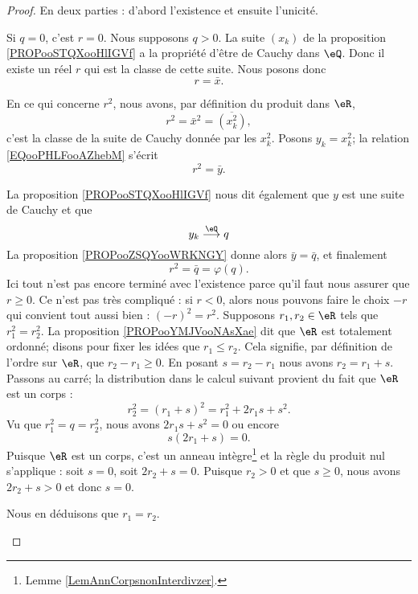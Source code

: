 \begin{proof}
	En deux parties : d'abord l'existence et ensuite l'unicité.
	\begin{subproof}
		\spitem[Existence]
		Si \( q=0\), c'est \( r=0\). Nous supposons \( q>0\). La suite \( (x_k)\) de la proposition \ref{PROPooSTQXooHlIGVf} a la propriété d'être de Cauchy dans \( \eQ\). Donc il existe un réel \( r\) qui est la classe de cette suite. Nous posons donc
		\begin{equation}
			r=\bar x.
		\end{equation}

		En ce qui concerne \( r^2\), nous avons, par définition du produit dans \( \eR\),
		\begin{equation}        \label{EQooPHLFooAZhebM}
			r^2=\bar x^2=\overline{ (x_k^2) },
		\end{equation}
		c'est la classe de la suite de Cauchy donnée par les \( x_k^2\). Posons \( y_k=x_k^2\); la relation \eqref{EQooPHLFooAZhebM} s'écrit
		\begin{equation}
			r^2=\bar y.
		\end{equation}

		La proposition \ref{PROPooSTQXooHlIGVf} nous dit également que \( y\) est une suite de Cauchy et que
		\begin{equation}
			y_k\stackrel{\eQ}{\longrightarrow}q
		\end{equation}
		La proposition \ref{PROPooZSQYooWRKNGY} donne alors \( \bar y=\bar q\), et finalement
		\begin{equation}
			r^2=\bar q=\varphi(q).
		\end{equation}
		Ici tout n'est pas encore terminé avec l'existence parce qu'il faut nous assurer que \( r\geq 0\). Ce n'est pas très compliqué : si \( r<0\), alors nous pouvons faire le choix \( -r\) qui convient tout aussi bien : \( (-r)^2=r^2\).
		\spitem[Unicité]
		Supposons \( r_1,r_2\in \eR\) tels que \( r_1^2=r_2^2\). La proposition \ref{PROPooYMJVooNAsXae} dit que \( \eR\) est totalement ordonné; disons pour fixer les idées que \( r_1\leq r_2\). Cela signifie, par définition de l'ordre sur \( \eR\), que \( r_2-r_1\geq 0\). En posant \( s=r_2-r_1\) nous avons \( r_2=r_1+s\). Passons au carré; la distribution dans le calcul suivant provient du fait que \( \eR\) est un corps :
		\begin{equation}
			r_2^2=(r_1+s)^2=r_1^2+2r_1s+s^2.
		\end{equation}
		Vu que \( r_1^2=q=r_2^2\), nous avons \( 2r_1s+s^2=0\) ou encore
		\begin{equation}
			s(2r_1+s)=0.
		\end{equation}
		Puisque \( \eR\) est un corps, c'est un anneau intègre\footnote{Lemme \ref{LemAnnCorpsnonInterdivzer}.} et la règle du produit nul s'applique : soit \( s=0\), soit \( 2r_2+s=0\). Puisque \( r_2>0\) et que \( s\geq 0\), nous avons \( 2r_2+s>0\) et donc \( s=0\).

		Nous en déduisons que \( r_1=r_2\).
	\end{subproof}
\end{proof}


